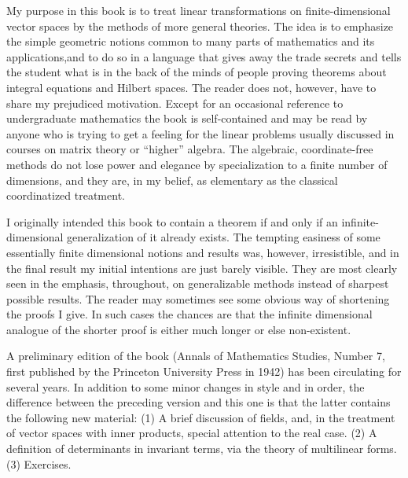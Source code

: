 

My purpose in this book is to treat linear transformations on finite-dimensional
vector spaces by the methods of more general theories. The idea is to emphasize
the simple geometric notions common to many parts of mathematics and its
applications,and to do so in a language that gives away the trade secrets and
tells the student what is in the back of the minds of people proving theorems
about integral equations and Hilbert spaces. The reader does not, however, have
to share my prejudiced motivation. Except for an occasional reference to
undergraduate mathematics the book is self-contained and may be read by anyone
who is trying to get a feeling for the linear problems usually discussed in
courses on matrix theory or ``higher'' algebra. The algebraic, coordinate-free
methods do not lose power and elegance by specialization to a finite number of
dimensions, and they are, in my belief, as elementary as the classical
coordinatized treatment.

I originally intended this book to contain a theorem if and only if an
infinite-dimensional generalization of it already exists. The tempting easiness
of some essentially finite dimensional notions and results was, however,
irresistible, and in the final result my initial intentions are just barely
visible. They are most clearly seen in the emphasis, throughout, on
generalizable methods instead of sharpest possible results. The reader may
sometimes see some obvious way of shortening the proofs I give. In such cases
the chances are that the infinite dimensional analogue of the shorter proof is
either much longer or else non-existent.

A preliminary edition of the book (Annals of Mathematics Studies, Number 7,
first published by the Princeton University Press in 1942) has been circulating
for several years. In addition to some minor changes in style and in order, the
difference between the preceding version and this one is that the latter
contains the following new material: (1) A brief discussion of fields, and, in
the treatment of vector spaces with inner products, special attention to the
real case. (2) A definition of determinants in invariant terms, via the theory
of multilinear forms. (3) Exercises.


